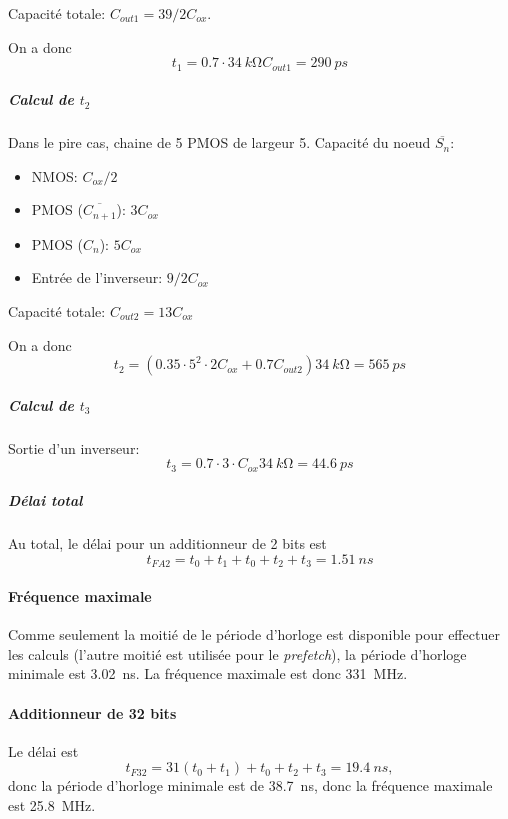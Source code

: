\documentclass[frenchb,DIV=14]{scrartcl}
\begin{document}
Capacité totale: $C_{out1} = 39/2 C_{ox}$.

On a donc
\[t_1 = 0.7 \cdot \SI{34}{k\ohm} C_{out1} = \SI{290}{ps}\]

\subparagraph{Calcul de $t_2$}
Dans le pire cas, chaine de 5 PMOS de largeur 5.
Capacité du noeud $\overline{S_n}$:
\begin{itemize}
\item NMOS: $C_{ox}/2$
\item PMOS ($\overline{C_{n+1}}$): $3C_{ox}$
\item PMOS ($C_n$): $5C_{ox}$
\item Entrée de l'inverseur: $9/2 C_{ox}$
\end{itemize}
Capacité totale: $C_{out2} = 13 C_{ox}$

On a donc
\[t_2 = (0.35\cdot 5^2\cdot 2 C_{ox} + 0.7 C_{out2})\SI{34}{k\ohm} = \SI{565}{ps}\]

\subparagraph{Calcul de $t_3$}
Sortie d'un inverseur:
\[t_3 = 0.7 \cdot 3 \cdot C_{ox} \SI{34}{k\ohm} = \SI{44.6}{ps}\]

\subparagraph{Délai total}
Au total, le délai pour un additionneur de 2 bits est
\[t_{FA2} = t_0 + t_1 + t_0 + t_2 + t_3 = \SI{1.51}{ns}\]

\paragraph{Fréquence maximale}
Comme seulement la moitié de le période d'horloge est disponible pour
effectuer les calculs (l'autre moitié est utilisée pour le \emph{prefetch}),
la période d'horloge minimale est \SI{3.02}{ns}. La fréquence maximale est
donc \SI{331}{MHz}.

\paragraph{Additionneur de 32 bits}
Le délai est
\[t_{F32} = 31 (t_0 + t_1) + t_0 + t_2 + t_3 = \SI{19.4}{ns},\]
donc la période d'horloge minimale est de \SI{38.7}{ns}, donc la
fréquence maximale est \SI{25.8}{MHz}.
\end{document}
